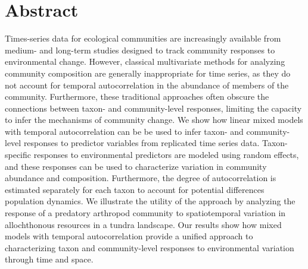 
\section*{Abstract}

Times-series data for ecological communities are increasingly available
from medium- and long-term studies designed to track community responses
to environmental change. However, classical multivariate methods for
analyzing community composition are generally inappropriate for time series,
as they do not account for temporal autocorrelation
in the abundance of members of the community.
Furthermore, these traditional approaches often obscure the connections between
taxon- and community-level responses, limiting the capacity to
infer the mechanisms of community change.
We show how linear mixed models with temporal autocorrelation
can be be used to infer taxon- and community-level responses
to predictor variables from replicated time series data.
Taxon-specific responses to environmental predictors are modeled
using random effects, and these responses can be used to characterize
variation in community abundance and composition.
Furthermore, the degree of autocorrelation is
estimated separately for each taxon
to account for potential differences population dynamics.
We illustrate the utility of the approach
by analyzing the response of a predatory arthropod community to
spatiotemporal variation in allochthonous resources in a tundra landscape.
Our results show how mixed models with temporal autocorrelation provide
a unified approach to characterizing taxon and community-level
responses to environmental variation through time and space.
